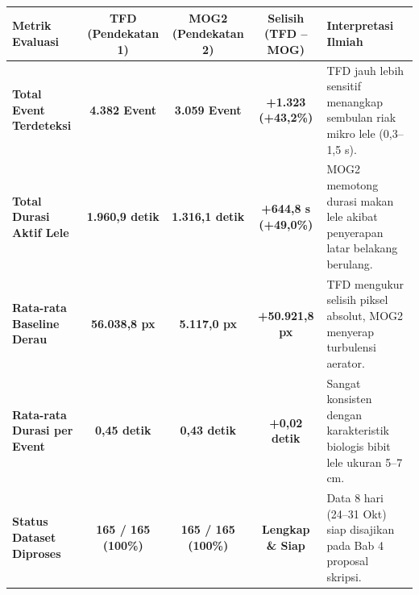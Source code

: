 \documentclass[10pt,a4paper]{article}
\begin{document}
\begin{table}[h!]
\centering
\small
\begin{tabular}{|l|c|c|c|p{7.2cm}|}
\hline
\textbf{Metrik Evaluasi} & \textbf{TFD (Pendekatan 1)} & \textbf{MOG2 (Pendekatan 2)} & \textbf{Selisih (TFD -- MOG)} & \textbf{Interpretasi Ilmiah} \\
\hline
\textbf{Total Event Terdeteksi} & \textbf{4.382 Event} & \textbf{3.059 Event} & \textbf{+1.323 (+43,2\%)} & TFD jauh lebih sensitif menangkap sembulan riak mikro lele (0,3--1,5 s). \\
\textbf{Total Durasi Aktif Lele} & \textbf{1.960,9 detik} & \textbf{1.316,1 detik} & \textbf{+644,8 s (+49,0\%)} & MOG2 memotong durasi makan lele akibat penyerapan latar belakang berulang. \\
\textbf{Rata-rata Baseline Derau} & \textbf{56.038,8 px} & \textbf{5.117,0 px} & \textbf{+50.921,8 px} & TFD mengukur selisih piksel absolut, MOG2 menyerap turbulensi aerator. \\
\textbf{Rata-rata Durasi per Event} & \textbf{0,45 detik} & \textbf{0,43 detik} & \textbf{+0,02 detik} & Sangat konsisten dengan karakteristik biologis bibit lele ukuran 5--7 cm. \\
\textbf{Status Dataset Diproses} & \textbf{165 / 165 (100\%)} & \textbf{165 / 165 (100\%)} & \textbf{Lengkap \& Siap} & Data 8 hari (24--31 Okt) siap disajikan pada Bab 4 proposal skripsi. \\
\hline
\end{tabular}
\end{table}

\vspace{-6pt}
\end{document}
